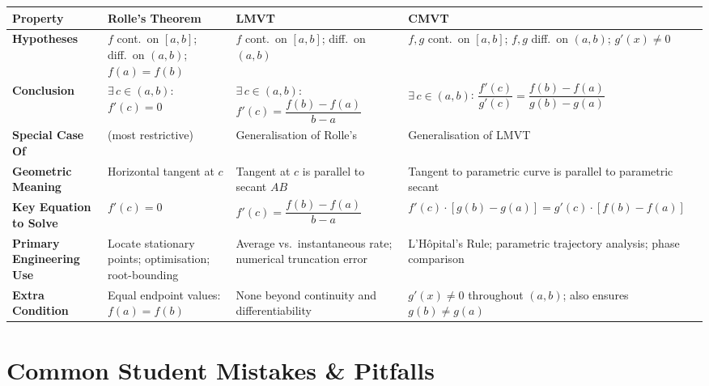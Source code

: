 \documentclass[12pt,a4paper]{article}
\begin{document}
\begin{center}
\begin{tabular}{>{\bfseries}p{3.5cm} p{3.5cm} p{3.5cm} p{4cm}}
\toprule
Property & Rolle's Theorem & LMVT & CMVT \\
\midrule
Hypotheses &
  $f$ cont.\ on $[a,b]$; diff.\ on $(a,b)$; $f(a)=f(b)$ &
  $f$ cont.\ on $[a,b]$; diff.\ on $(a,b)$ &
  $f,g$ cont.\ on $[a,b]$; $f,g$ diff.\ on $(a,b)$; $g'(x)\neq0$ \\
\addlinespace
Conclusion &
  $\exists\, c \in (a,b)$: $f'(c)=0$ &
  $\exists\, c \in (a,b)$: $f'(c) = \dfrac{f(b)-f(a)}{b-a}$ &
  $\exists\, c \in (a,b)$: $\dfrac{f'(c)}{g'(c)} = \dfrac{f(b)-f(a)}{g(b)-g(a)}$ \\
\addlinespace
Special Case Of &
  (most restrictive) &
  Generalisation of Rolle's &
  Generalisation of LMVT \\
\addlinespace
Geometric Meaning &
  Horizontal tangent at $c$ &
  Tangent at $c$ is parallel to secant $AB$ &
  Tangent to parametric curve is parallel to parametric secant \\
\addlinespace
Key Equation to Solve &
  $f'(c)=0$ &
  $f'(c)=\dfrac{f(b)-f(a)}{b-a}$ &
  $f'(c) \cdot [g(b)-g(a)] = g'(c) \cdot [f(b)-f(a)]$ \\
\addlinespace
Primary Engineering Use &
  Locate stationary points; optimisation; root-bounding &
  Average vs.\ instantaneous rate; numerical truncation error &
  L'H\^{o}pital's Rule; parametric trajectory analysis; phase comparison \\
\addlinespace
Extra Condition &
  Equal endpoint values: $f(a)=f(b)$ &
  None beyond continuity and differentiability &
  $g'(x)\neq0$ throughout $(a,b)$; also ensures $g(b)\neq g(a)$ \\
\bottomrule
\end{tabular}
\end{center}

\section{Common Student Mistakes \& Pitfalls}
\end{document}
